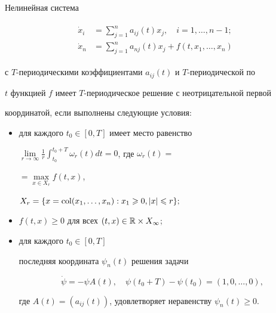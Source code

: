\begin{exam}Нелинейная система


%


\begin{align}


\begin{split}


\Dot x_i &= \sum_{j=1}^{n}a_{ij}(t)x_j,\quad i=1,\dotsc,n-1; \\


\Dot x_n &= \sum_{j=1}^{n}a_{nj}(t)x_j + f(t,x_1,\dotsc,x_n)


\end{split}


\end{align}


%


с $T$-периодическими коэффициентами $a_{ij}(t)$ и $T$-периодической по


$t$ функцией $f$ имеет $T$-периодическое решение с неотрицательной первой


координатой, если выполнены следующие условия:


\begin{itemize}


\item[1)] для каждого $t_0\in [0, T]$ имеет место равенство


$\lim\limits_{r\to \infty}{\displaystyle\frac{1}{r}\int_{t_0}^{t_0+T}


\omega_r(t) dt =0}$, где $\omega_r(t)=$\linebreak




$=\max\limits_{x\in X_r}f(t,x)$,


$X_{r}=\{x=\operatorname{col}(x_1,\dotsc,x_n) : x_1 \geqslant 0, |x|\leqslant r\};$


%


\item[2)] $f(t,x)\ge 0$ для всех $(t,x)\in \Bbb R\times X_{\infty}$;


%


\item[3)] для каждого $t_0\in [0, T]$


последняя координата $\psi_n(t)$ решения задачи


$$


\Dot \psi = -\psi A(t),\quad \psi(t_0+T) - \psi(t_0) = (1,0,\dotsc,0),


$$


где $A(t)=(a_{ij}(t))$, удовлетворяет неравенству $\psi_n(t)\ge 0$.


\end{itemize}


\end{exam}






